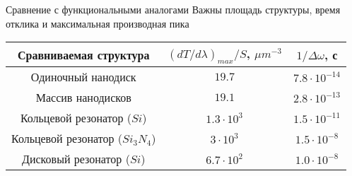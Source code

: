\begin{frame}{Сравнение с функциональными аналогами}
	Важны площадь структуры, время отклика и максимальная производная пика
	\begin{table}
		\centering
		\begin{tabular}{|c|c|c|}
			\hline
			Сравниваемая структура & $\left(dT/d\lambda\right)_{max}/S$, $\mu m^{-3}$ & 	$1/\Delta \omega$, с \\
			\hline
			Одиночный нанодиск & $19.7$ & $7.8 \cdot 10^{-14}$\\
			\hline
			Массив нанодисков & $19.1$ & $2.8 \cdot 10^{-13}$\\
			\hline
			Кольцевой резонатор ($Si$) \footnotemark & $1.3 \cdot 10^3$ & $1.5 \cdot 10^{-11}$\\
			\hline
			Кольцевой резонатор ($Si_3 N_4$) \footnotemark & $3 \cdot 10^3$ & $1.5 \cdot 10^{-8}$\\
			\hline
			Дисковый резонатор ($Si$) \footnotemark & $6.7 \cdot 10^2$ & $1.0 	\cdot 10^{-8}$\\
			\hline
		\end{tabular}
	\end{table}
	
\end{frame}